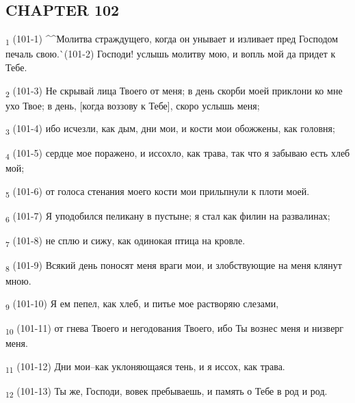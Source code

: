 \subsection{CHAPTER 102}
\begin{tcolorbox}
\textsubscript{1} (101-1) ^^Молитва страждущего, когда он унывает и изливает пред Господом печаль свою.^^ (101-2) Господи! услышь молитву мою, и вопль мой да придет к Тебе.
\end{tcolorbox}
\begin{tcolorbox}
\textsubscript{2} (101-3) Не скрывай лица Твоего от меня; в день скорби моей приклони ко мне ухо Твое; в день, [когда воззову к Тебе], скоро услышь меня;
\end{tcolorbox}
\begin{tcolorbox}
\textsubscript{3} (101-4) ибо исчезли, как дым, дни мои, и кости мои обожжены, как головня;
\end{tcolorbox}
\begin{tcolorbox}
\textsubscript{4} (101-5) сердце мое поражено, и иссохло, как трава, так что я забываю есть хлеб мой;
\end{tcolorbox}
\begin{tcolorbox}
\textsubscript{5} (101-6) от голоса стенания моего кости мои прильпнули к плоти моей.
\end{tcolorbox}
\begin{tcolorbox}
\textsubscript{6} (101-7) Я уподобился пеликану в пустыне; я стал как филин на развалинах;
\end{tcolorbox}
\begin{tcolorbox}
\textsubscript{7} (101-8) не сплю и сижу, как одинокая птица на кровле.
\end{tcolorbox}
\begin{tcolorbox}
\textsubscript{8} (101-9) Всякий день поносят меня враги мои, и злобствующие на меня клянут мною.
\end{tcolorbox}
\begin{tcolorbox}
\textsubscript{9} (101-10) Я ем пепел, как хлеб, и питье мое растворяю слезами,
\end{tcolorbox}
\begin{tcolorbox}
\textsubscript{10} (101-11) от гнева Твоего и негодования Твоего, ибо Ты вознес меня и низверг меня.
\end{tcolorbox}
\begin{tcolorbox}
\textsubscript{11} (101-12) Дни мои--как уклоняющаяся тень, и я иссох, как трава.
\end{tcolorbox}
\begin{tcolorbox}
\textsubscript{12} (101-13) Ты же, Господи, вовек пребываешь, и память о Тебе в род и род.
\end{tcolorbox}
